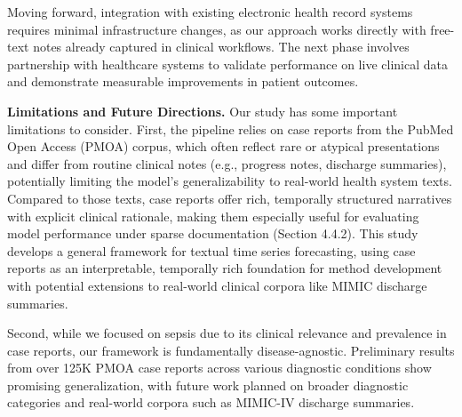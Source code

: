 Moving forward, integration with existing electronic health record systems requires minimal infrastructure changes, as our approach works directly with free-text notes already captured in clinical workflows. 
The next phase involves partnership with healthcare systems to validate performance on live clinical data and demonstrate measurable improvements in patient outcomes.

\textbf{Limitations and Future Directions.} 
Our study has some important limitations to consider. First, the pipeline relies on case reports from the PubMed Open Access (PMOA) corpus, which often reflect rare or atypical presentations and differ from routine clinical notes (e.g., progress notes, discharge summaries), potentially limiting the model’s generalizability to real-world health system texts. Compared to those texts, case reports offer rich, temporally structured narratives with explicit clinical rationale, making them especially useful for evaluating model performance under sparse documentation (Section 4.4.2). This study develops a general framework for textual time series forecasting, using case reports as an interpretable, temporally rich foundation for method development with potential extensions to real-world clinical corpora like MIMIC discharge summaries.

Second, while we focused on sepsis due to its clinical relevance and prevalence in case reports, our framework is fundamentally disease-agnostic. Preliminary results from over 125K PMOA case reports across various diagnostic conditions show promising generalization, with future work planned on broader diagnostic categories and real-world corpora such as MIMIC-IV discharge summaries.

